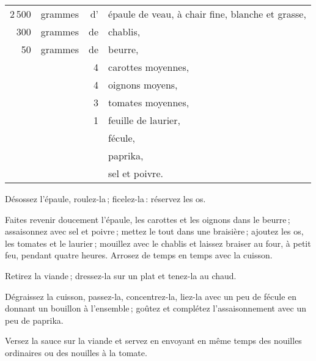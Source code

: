 \footnotesize
\begin{longtable}{rrrp{16em}}
  2 500 & grammes & d' & épaule de veau, à chair fine, blanche et grasse,                                 \\
    300 & grammes & de & chablis,                                                                         \\
     50 & grammes & de & beurre,                                                                          \\
        &         &  4 & carottes moyennes,                                                               \\
        &         &  4 & oignons moyens,                                                                  \\
        &         &  3 & tomates moyennes,                                                                \\
        &         &  1 & feuille de laurier,                                                              \\
        &         &    & fécule,                                                                          \\
        &         &    & paprika,                                                                         \\
        &         &    & sel et poivre.                                                                   \\
\end{longtable}
\normalsize

Désossez l'épaule, roulez-la ; ficelez-la : réservez les os.

Faites revenir doucement l'épaule, les carottes et les oignons dans le beurre ;
assaisonnez avec sel et poivre ; mettez le tout dans une braisière ; ajoutez
les os, les tomates et le laurier ; mouillez avec le chablis et laissez braiser
au four, à petit feu, pendant quatre heures. Arrosez de temps en temps avec la
cuisson.

Retirez la viande ; dressez-la sur un plat et tenez-la au chaud.

Dégraissez la cuisson, passez-la, concentrez-la, liez-la avec un peu de fécule
en donnant un bouillon à l'ensemble ; goûtez et complétez l'assaisonnement avec
un peu de paprika.

Versez la sauce sur la viande et servez en envoyant en même temps des nouilles
ordinaires ou des nouilles à la tomate.

